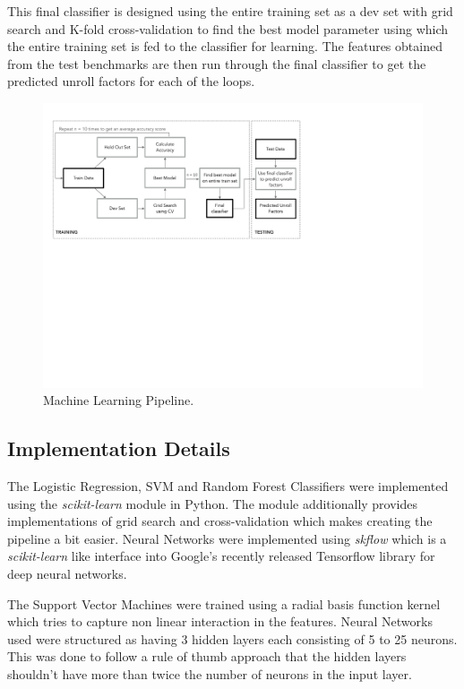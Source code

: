 \documentclass[]{sig-alternate}
\begin{document}
This final classifier is designed using the entire training set as a dev set with grid search and K-fold cross-validation to find the best model parameter using which the entire training set is fed to the classifier for learning. The features obtained from the test benchmarks are then run through the final classifier to get the predicted unroll factors for each of the loops. 

\begin{figure}
  \center
  \includegraphics[width=0.9\linewidth]{fig/mlPipeline.pdf}
  \caption{Machine Learning Pipeline.}
  \label{fig:mlPipeline}
\end{figure}


\subsection{Implementation Details}
\label{subsec:ImplementationDetails}

The Logistic Regression, SVM and Random Forest Classifiers were implemented using the \emph{scikit-learn} module in Python. The module additionally provides implementations of grid search and cross-validation which makes creating the pipeline a bit easier. Neural Networks were implemented using \emph{skflow} which is a \emph{scikit-learn} like interface into Google's recently released Tensorflow library for deep neural networks. 

The Support Vector Machines were trained using a radial basis function kernel which tries to capture non linear interaction in the features. Neural Networks used were structured as having 3 hidden layers each consisting of 5 to 25 neurons. This was done to follow a rule of thumb approach that the hidden layers shouldn't have more than twice the number of neurons in the input layer.
\end{document}
